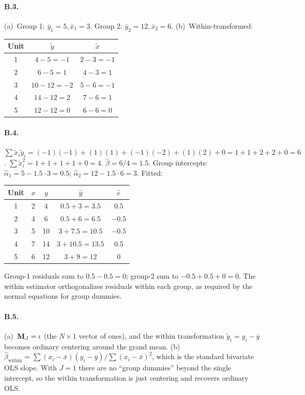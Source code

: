 \documentclass{article}
\begin{document}
\paragraph{B.3.}  (a)~Group 1: $\bar y_1 = 5, \bar x_1 = 3$.  Group 2: $\bar y_2 = 12, \bar x_2 = 6$.  (b)~Within-transformed:
\begin{center}
\begin{tabular}{c|cc}
Unit & $\tilde y$ & $\tilde x$ \\
\hline
1 & $4 - 5 = -1$ & $2 - 3 = -1$ \\
2 & $6 - 5 = 1$ & $4 - 3 = 1$ \\
3 & $10 - 12 = -2$ & $5 - 6 = -1$ \\
4 & $14 - 12 = 2$ & $7 - 6 = 1$ \\
5 & $12 - 12 = 0$ & $6 - 6 = 0$
\end{tabular}
\end{center}

\paragraph{B.4.}  $\sum \tilde x_i\tilde y_i = (-1)(-1) + (1)(1) + (-1)(-2) + (1)(2) + 0 = 1 + 1 + 2 + 2 + 0 = 6$.  $\sum \tilde x_i^2 = 1 + 1 + 1 + 1 + 0 = 4$.  $\hat\beta = 6/4 = 1.5$.  Group intercepts: $\hat\alpha_1 = 5 - 1.5\cdot 3 = 0.5$; $\hat\alpha_2 = 12 - 1.5\cdot 6 = 3$.  Fitted:
\begin{center}
\begin{tabular}{c|cccc}
Unit & $x$ & $y$ & $\hat y$ & $\hat e$ \\
\hline
1 & 2 & 4 & $0.5 + 3 = 3.5$ & $0.5$ \\
2 & 4 & 6 & $0.5 + 6 = 6.5$ & $-0.5$ \\
3 & 5 & 10 & $3 + 7.5 = 10.5$ & $-0.5$ \\
4 & 7 & 14 & $3 + 10.5 = 13.5$ & $0.5$ \\
5 & 6 & 12 & $3 + 9 = 12$ & $0$
\end{tabular}
\end{center}
Group-1 residuals sum to $0.5 - 0.5 = 0$; group-2 sum to $-0.5 + 0.5 + 0 = 0$.  The within estimator orthogonalizes residuals within each group, as required by the normal equations for group dummies.

\paragraph{B.5.}  (a)~${\mathbf M}_J = \mathbf\iota$ (the $N\times 1$ vector of ones), and the within transformation $\tilde y_i = y_i - \bar y$ becomes ordinary centering around the grand mean.  (b)~$\hat\beta_{\text{within}} = \sum(x_i - \bar x)(y_i - \bar y)/\sum(x_i - \bar x)^2$, which is the standard bivariate OLS slope.  With $J = 1$ there are no ``group dummies'' beyond the single intercept, so the within transformation is just centering and recovers ordinary OLS.
\end{document}
